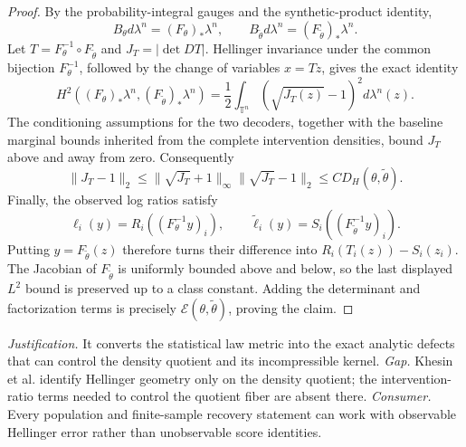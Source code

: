 \documentclass{article}
\begin{document}
\begin{proof}
By the probability-integral gauges and the synthetic-product identity,
\[
B_\theta d\lambda^n=(F_\theta)_*\lambda^n,
\qquad
B_{\widetilde\theta}d\lambda^n=(F_{\widetilde\theta})_*\lambda^n.
\]
Let \(T=F_\theta^{-1}\circ F_{\widetilde\theta}\) and \(J_T=|\det DT|\). Hellinger invariance under the common bijection \(F_\theta^{-1}\), followed by the change of variables \(x=Tz\), gives the exact identity
\[
H^2((F_\theta)_*\lambda^n,(F_{\widetilde\theta})_*\lambda^n)
=\frac12\int_{\mathbb T^n}(\sqrt{J_T(z)}-1)^2d\lambda^n(z).
\]
The conditioning assumptions for the two decoders, together with the baseline marginal bounds inherited from the complete intervention densities, bound \(J_T\) above and away from zero. Consequently
\[
\|J_T-1\|_2
\le \|\sqrt{J_T}+1\|_\infty\|\sqrt{J_T}-1\|_2
\le C D_H(\theta,\widetilde\theta).
\]
Finally, the observed log ratios satisfy
\[
\ell_i(y)=R_i((F_\theta^{-1}y)_i),
\qquad
\widetilde\ell_i(y)=S_i((F_{\widetilde\theta}^{-1}y)_i).
\]
Putting \(y=F_{\widetilde\theta}(z)\) therefore turns their difference into
\(R_i(T_i(z))-S_i(z_i)\). The Jacobian of \(F_{\widetilde\theta}\) is uniformly bounded above and below, so the last displayed \(L^2\) bound is preserved up to a class constant. Adding the determinant and factorization terms is precisely \(\mathcal E(\theta,\widetilde\theta)\), proving the claim.
\end{proof}
\par\smallskip\noindent \textit{Justification.} It converts the statistical law metric into the exact analytic defects that can control the density quotient and its incompressible kernel. \textit{Gap.} Khesin et al. identify Hellinger geometry only on the density quotient; the intervention-ratio terms needed to control the quotient fiber are absent there. \textit{Consumer.} Every population and finite-sample recovery statement can work with observable Hellinger error rather than unobservable score identities.
\end{document}
